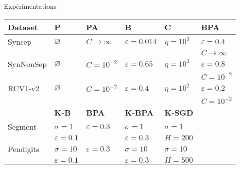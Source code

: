 \documentclass{beamer}
\begin{document}
\begin{frame}{Expérimentations}
\begin{small}
\begin{table}[h]
\begin{center}
\begin{tabular}{llllll}
				\hline
				{\bf Dataset}  & {\bf P} & {\bf PA } & {\bf B}& {\bf C} & {\bf BPA}\\
				\hline
				Synsep & $\varnothing$ & $C\rightarrow\infty$ & $\varepsilon = 0.014$ &$\eta = 10^3$ & $\varepsilon = 0.4$\\
				&&&&& $C \rightarrow \infty$\\
				
				SynNonSep & $\varnothing$ & $C=10^{-2}$ & $\varepsilon =0.65$ & $\eta = 10^3$& $\varepsilon = 0.8$\\
				&&&&& $C = 10^{-2}$\\			
				RCV1-v2 & $\varnothing$ & $C=10^{-2}$ & $\varepsilon =0.4$ & $\eta = 10^2$ & $\varepsilon = 0.2$\\
				&&&&& $C = 10^{-2}$\\
				\hline
				&{\bf K-B} & {\bf BPA} & {\bf K-BPA} &{\bf K-SGD}\\
				\hline
				Segment & $\sigma = 1$ & $\varepsilon = 0.3$ & $\sigma = 1$ &$\sigma = 1$\\
				&$\varepsilon =0.1$&&$\varepsilon = 0.3$ & $H = 200$\\
				Pendigits & $\sigma = 10$ & $\varepsilon = 0.3$ &$\sigma = 10$&$\sigma = 10$\\
				&$\varepsilon =0.1$&& $\varepsilon = 0.3$ & $H = 500$\\
				
				
			\end{tabular}	
		\end{center}
	\end{table}
	\end{small}
\end{frame}
\end{document}
